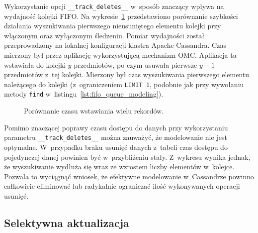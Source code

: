 Wykorzystanie opcji \verb+__track_deletes__+ w~sposób znaczący wpływa na wydajność kolejki FIFO. Na wykresie~\ref{fig:fifo_select_time_comparison} przedstawiono porównanie szybkości działania wyszukiwania pierwszego nieusuniętego elementu kolejki przy włączonym oraz wyłączonym śledzeniu. Pomiar wydajności został przeprowadzony na lokalnej konfiguracji klastra Apache Cassandra. Czas mierzony był przez aplikację wykorzystującą mechanizm OMC. Aplikacja ta wstawiała do kolejki $y$ przedmiotów, po czym usuwała pierwsze $y-1$ przedmiotów z~tej kolejki. Mierzony był czas wyszukiwania pierwszego elementu należącego do kolejki (z~ograniczeniem \verb+LIMIT 1+, podobnie jak przy wywołaniu metody \verb+find+ w~listingu~\ref{lst:fifo_queue_modeling}). 

\begin{figure}
	\centering

	\caption{Porównanie czasu wstawiania wielu rekordów.}
	\label{fig:fifo_select_time_comparison}
\end{figure}

Pomimo znaczącej poprawy czasu dostępu do danych przy wykorzystaniu parametru \verb+__track_deletes__+ można zauważyć, że modelowanie nie jest optymalne. W~przypadku braku usunięć danych z~tabeli czas dostępu do pojedynczej danej powinien być w~przybliżeniu stały. Z~wykresu wynika jednak, że wyszukiwanie wydłuża się wraz ze wzrostem liczby elementów w~kolejce. Pozwala to wyciągnąć wniosek, że efektywne modelowanie w~Cassandrze powinno całkowicie eliminować lub radykalnie ograniczać ilość wykonywanych operacji usunięć.

\subsection{Selektywna aktualizacja}

